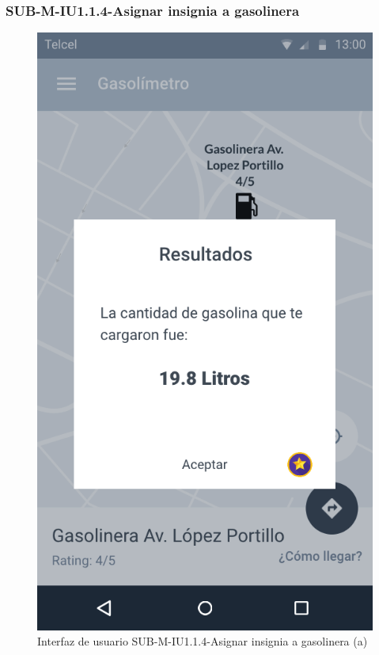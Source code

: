 \subsubsection{SUB-M-IU1.1.4-Asignar insignia a gasolinera}\label{SUB-M-IU1.1.4}
\begin{figure}[H]
	\centering
	\includegraphics[scale=.55]{Capitulo4/software/submodulos/mediciones/images/sub-m-iu1_1_4_a}
	\caption{Interfaz de usuario SUB-M-IU1.1.4-Asignar insignia a gasolinera (a)}
	\label{fig:sub-m-iu1.1.4.a}
\end{figure}
